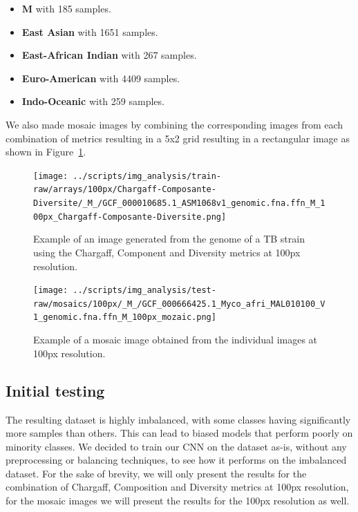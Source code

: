 \begin{itemize}
	\item \textbf{M} with 185 samples.
	\item \textbf{East Asian} with 1651 samples.
	\item \textbf{East-African Indian} with 267 samples.
	\item \textbf{Euro-American} with 4409 samples.
	\item \textbf{Indo-Oceanic} with 259 samples.
\end{itemize}

We also made mosaic images by combining the corresponding images from each combination of metrics resulting in a 5x2 grid resulting in a
rectangular image as shown in Figure~\ref{fig:mosaic_example}.

\begin{figure}[H]
	\centering
	\begin{minipage}[t]{0.48\textwidth}
		\centering
		\texttt{[image: ../scripts/img\_analysis/train-raw/arrays/100px/Chargaff-Composante-Diversite/\_M\_/GCF\_000010685.1\_ASM1068v1\_genomic.fna.ffn\_M\_100px\_Chargaff-Composante-Diversite.png]}
		\caption{Example of an image generated from the genome of a TB strain using the Chargaff, Component and Diversity metrics at 100px resolution.}
		\label{fig:example_image}
	\end{minipage}\hfill
	\begin{minipage}[t]{0.48\textwidth}
		\centering
		\texttt{[image: ../scripts/img\_analysis/test-raw/mosaics/100px/\_M\_/GCF\_000666425.1\_Myco\_afri\_MAL010100\_V1\_genomic.fna.ffn\_M\_100px\_mozaic.png]}
		\caption{Example of a mosaic image obtained from the individual images at 100px resolution.}
		\label{fig:mosaic_example}
	\end{minipage}
\end{figure}


\subsection{Initial testing}
\label{subsec:initial_testing}

The resulting dataset is highly imbalanced, with some classes having significantly more samples than others. This can lead to biased models
that perform poorly on minority classes. We decided to train our CNN on the dataset as-is, without any preprocessing or balancing techniques,
to see how it performs on the imbalanced dataset. For the sake of brevity, we will only present the results for the combination of Chargaff,
Composition and Diversity metrics at 100px resolution, for the mosaic images we will present the results for the 100px resolution as well.

